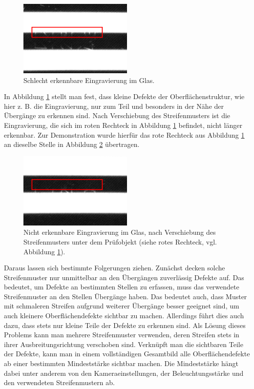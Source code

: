 \begin{figure}[H]
	\centering
	\includegraphics[frame,width=0.5\textwidth]{03_sichtpruefungDurchLichtstreuung/verfahren/figures/minorScratch}
	\caption[Eingravierung im Glas]{Schlecht erkennbare Eingravierung im Glas.}
	\label{img:engraving}
\end{figure}

\noindent
In Abbildung \ref{img:engraving} stellt man fest, dass kleine Defekte der Oberflächenstruktur, wie hier z. B. die Eingravierung, nur zum Teil und besonders in der Nähe der Übergänge zu erkennen sind.
Nach Verschiebung des Streifenmusters ist die Eingravierung, die sich im roten Rechteck in Abbildung \ref{img:engraving} befindet, nicht länger erkennbar.
Zur Demonstration wurde hierfür das rote Rechteck aus Abbildung \ref{img:engraving} an dieselbe Stelle in Abbildung \ref{img:verschiebungEngraving} übertragen.

\begin{figure}[H]
	\centering
	\includegraphics[frame,width=0.5\textwidth]{03_sichtpruefungDurchLichtstreuung/verfahren/figures/minorScratchTwo}
	\caption[Eingravierung im Glas nach Verschiebung des Streifenmusters]{Nicht erkennbare Eingravierung im Glas, nach Verschiebung des Streifenmusters unter dem Prüfobjekt (siehe rotes Rechteck, vgl. Abbildung \ref{img:engraving}).}
	\label{img:verschiebungEngraving}
\end{figure}

\noindent
Daraus lassen sich bestimmte Folgerungen ziehen.
Zunächst decken solche Streifenmuster nur unmittelbar an den Übergängen zuverlässig Defekte auf.
Das bedeutet, um Defekte an bestimmten Stellen zu erfassen, muss das verwendete Streifenmuster an den Stellen Übergänge haben.
Das bedeutet auch, dass Muster mit schmaleren Streifen aufgrund weiterer Übergänge besser geeignet sind, um auch kleinere Oberflächendefekte sichtbar zu machen.
Allerdings führt dies auch dazu, dass stets nur kleine Teile der Defekte zu erkennen sind.
Als Lösung dieses Problems kann man mehrere Streifenmuster verwenden, deren Streifen stets in ihrer Ausbreitungsrichtung verschoben sind.
Verknüpft man die sichtbaren Teile der Defekte, kann man in einem vollständigen Gesamtbild alle Oberflächendefekte ab einer bestimmten Mindeststärke sichtbar machen.
Die Mindeststärke hängt dabei unter anderem von den Kameraeinstellungen, der Beleuchtungsstärke und den verwendeten Streifenmustern ab.